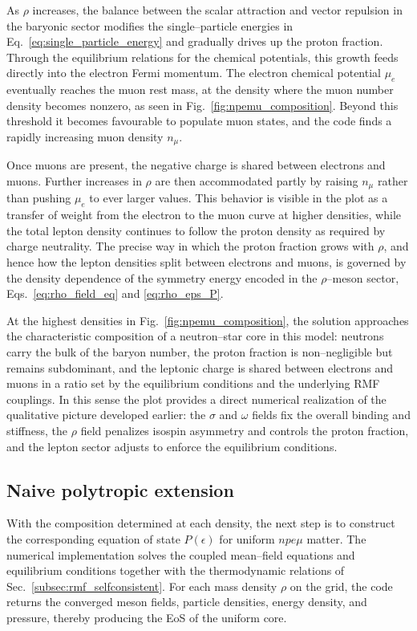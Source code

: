 As $\rho$ increases, the balance between the scalar attraction and vector
repulsion in the baryonic sector modifies the single–particle energies in
Eq.~\eqref{eq:single_particle_energy} and gradually drives up the proton
fraction. Through the equilibrium relations for the chemical potentials,
this growth feeds directly into the electron Fermi momentum. The electron
chemical potential $\mu_{e}$ eventually reaches the muon rest mass, 
at the density where the muon number density becomes nonzero, as seen 
in Fig.~\ref{fig:npemu_composition}.
Beyond this threshold it becomes favourable to populate muon states, and the
code finds a rapidly increasing muon density $n_{\mu}$.

Once muons are present, the negative charge is shared between electrons and
muons. Further increases in $\rho$ are then accommodated partly by raising
$n_{\mu}$ rather than pushing $\mu_{e}$ to ever larger values. This behavior
is visible in the plot as a transfer of weight from the electron to the muon
curve at higher densities, while the total lepton density continues to follow
the proton density as required by charge neutrality. The precise way in which
the proton fraction grows with $\rho$, and hence how the lepton densities
split between electrons and muons, is governed by the density dependence of
the symmetry energy encoded in the $\rho$–meson sector,
Eqs.~\eqref{eq:rho_field_eq} and \eqref{eq:rho_eps_P}.

At the highest densities in Fig.~\ref{fig:npemu_composition}, the solution
approaches the characteristic composition of a neutron–star core in this
model: neutrons carry the bulk of the baryon number, the proton fraction is
non–negligible but remains subdominant, and the leptonic charge is shared
between electrons and muons in a ratio set by the equilibrium conditions and
the underlying RMF couplings. In this sense the plot provides a direct
numerical realization of the qualitative picture developed earlier: the
$\sigma$ and $\omega$ fields fix the overall binding and stiffness, the
$\rho$ field penalizes isospin asymmetry and controls the proton fraction,
and the lepton sector adjusts to enforce the equilibrium conditions.

\subsection*{Naive polytropic extension}
\label{subsec:polytrope_results}
With the composition determined at each density, the next step is to
construct the corresponding equation of state $P(\epsilon)$ for uniform
$npe\mu$ matter. The numerical implementation solves the coupled mean–field
equations and equilibrium conditions together with the thermodynamic
relations of Sec.~\ref{subsec:rmf_selfconsistent}. For each mass density
$\rho$ on the grid, the code returns the converged meson fields, particle
densities, energy density, and pressure, thereby producing the EoS of the
uniform core.

